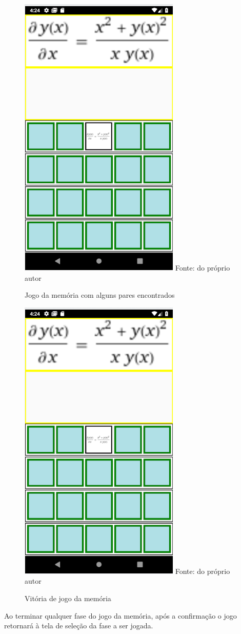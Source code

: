 \begin{figure}[H]
\centering
\caption{Jogo da memória com alguns pares encontrados}
\includegraphics[scale=0.72]{figuras/resolucao_1imagem.png}
\small{Fonte: do próprio autor}
\end{figure}

\begin{figure}[H]
\centering
\caption{Vitória de jogo da memória}
\includegraphics[scale=0.72]{figuras/resolucao_1imagem.png}
\small{Fonte: do próprio autor}
\end{figure}

Ao terminar qualquer fase do jogo da memória, após a confirmação o jogo retornará à tela de seleção da fase a ser jogada.

